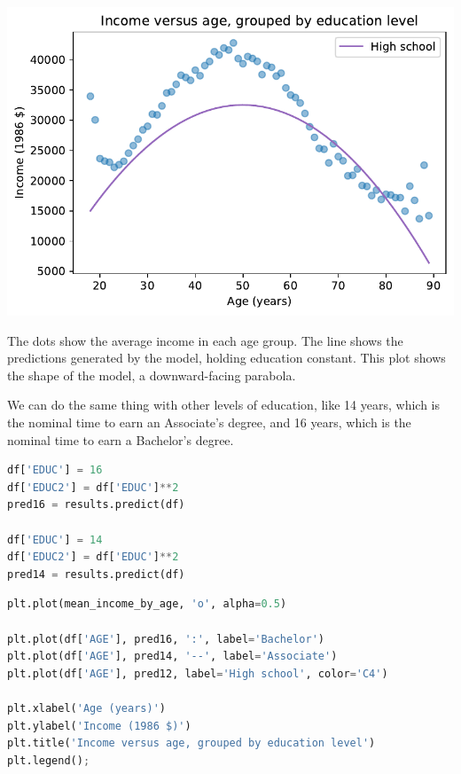 \begin{center}
\includegraphics[scale=0.75]{10_regression_files/10_regression_53_0.pdf}
\end{center}

The dots show the average income in each age group. The line shows the
predictions generated by the model, holding education constant. This
plot shows the shape of the model, a downward-facing parabola.

We can do the same thing with other levels of education, like 14 years,
which is the nominal time to earn an Associate's degree, and 16 years,
which is the nominal time to earn a Bachelor's degree.

\begin{lstlisting}[language=Python,style=source]
df['EDUC'] = 16
df['EDUC2'] = df['EDUC']**2
pred16 = results.predict(df)

df['EDUC'] = 14
df['EDUC2'] = df['EDUC']**2
pred14 = results.predict(df)
\end{lstlisting}

\begin{lstlisting}[language=Python,style=source]
plt.plot(mean_income_by_age, 'o', alpha=0.5)

plt.plot(df['AGE'], pred16, ':', label='Bachelor')
plt.plot(df['AGE'], pred14, '--', label='Associate')
plt.plot(df['AGE'], pred12, label='High school', color='C4')

plt.xlabel('Age (years)')
plt.ylabel('Income (1986 $)')
plt.title('Income versus age, grouped by education level')
plt.legend();
\end{lstlisting}

